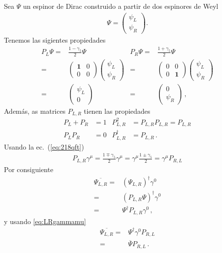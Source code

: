 Sea $\Psi$ un espinor de Dirac construido a partir de dos espinores de Weyl
\begin{align}
  \Psi=
  \begin{pmatrix}
   \psi_L\\
    \psi_R
  \end{pmatrix}.
\end{align}
Tenemos las sigientes propiedades
\begin{align}
   P_L \Psi=& \frac{1-\gamma_5}{2}\Psi & P_R \Psi=& \frac{1+\gamma_5}{2}\Psi \nonumber\\
   =&
   \begin{pmatrix}
    \mathbf{1} & 0 \\
     0 & 0
   \end{pmatrix} \begin{pmatrix}
   \psi_L\\
    \psi_R
  \end{pmatrix} & =&\begin{pmatrix}
    0 & 0 \\
     0 & \mathbf{1}
   \end{pmatrix} \begin{pmatrix}
   \psi_L\\
    \psi_R
  \end{pmatrix}\nonumber\\
  =& \begin{pmatrix}
   \psi_L\\
    0
  \end{pmatrix} & =& \begin{pmatrix}
   0\\
    \psi_R
  \end{pmatrix}\,,
\end{align}
Además,
as matrices $P_{L,R}$ tienen las propiedades
\begin{align}
  P_L+P_R&=1 & P_{L,R}^2&=P_{L,R}P_{L,R}=P_{L,R}\nonumber\\
  P_L P_R&=0& P_{L,R}^\dagger&=P_{L,R}\,.
\end{align}
Usando la ec.~(\ref{eq:218qft})
\begin{align}
  \label{eq:LRgammamu}
  P_{L,R}\gamma^\mu=\frac{1\mp\gamma_5}{2}\gamma^\mu=\gamma^\mu\frac{1\pm\gamma_5}{2}=\gamma^\mu P_{R,L}
\end{align}
Por consiguiente
\begin{align}
  \overline{\Psi_{L,R}}=&\left(\Psi_{L,R} \right)^{\dagger}\gamma^0 \nonumber\\
  =&\left(P_{L,R}\Psi \right)^{\dagger}\gamma^0 \nonumber\\
  =&\Psi^{\dagger}P_{L,R}\gamma^0 \,,
\end{align}
y usando \eqref{eq:LRgammamu}
\begin{align}
  \overline{\Psi_{L,R}}=& \Psi^{\dagger}\gamma^0 P_{R,L} \nonumber\\
=&\overline{\Psi} P_{R,L}\,.
\end{align}




